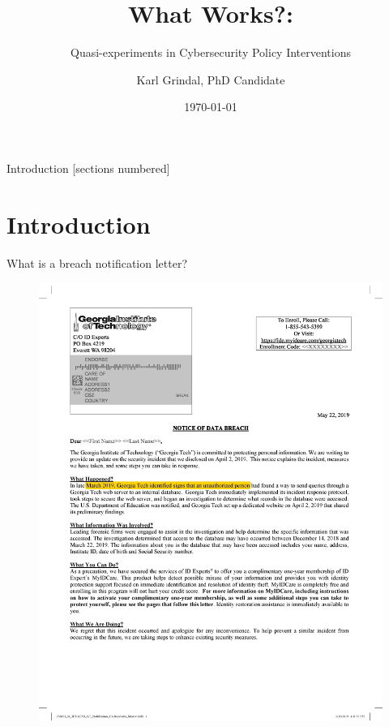 \documentclass[10pt]{beamer}
\title{What Works?:}
\subtitle{Quasi-experiments in Cybersecurity Policy Interventions}
\date{\today}
\author{Karl Grindal, PhD Candidate}
\institute{Georgia Institute of Technology}
\begin{document}
\maketitle

\begin{frame}{Introduction}
  [sections numbered]
  \tableofcontents%
\end{frame}

\section{Introduction}

\begin{frame}{What is a breach notification letter?}
  \begin{figure}
	\includegraphics[width=\textwidth]{Figures/GT_Notification Letter_CA_highlight_all.jpg}
    \end{figure}
\end{frame}
\end{document}
